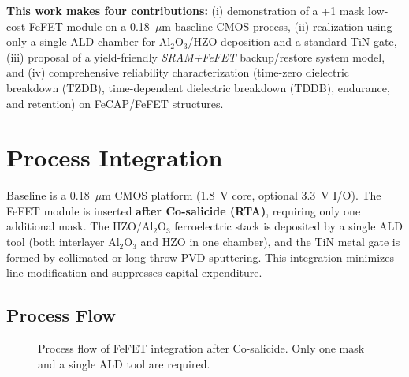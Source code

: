 \documentclass[conference]{IEEEtran}
\begin{document}
\textbf{This work makes four contributions:}  
(i) demonstration of a +1 mask low-cost FeFET module on a 0.18~$\mu$m baseline CMOS process,  
(ii) realization using only a single ALD chamber for Al$_2$O$_3$/HZO deposition and a standard TiN gate,  
(iii) proposal of a yield-friendly \textit{SRAM+FeFET} backup/restore system model, and  
(iv) comprehensive reliability characterization (time-zero dielectric breakdown (TZDB), time-dependent dielectric breakdown (TDDB), endurance, and retention) on FeCAP/FeFET structures.

\section{Process Integration}
Baseline is a 0.18~$\mu$m CMOS platform (1.8~V core, optional 3.3~V I/O).
The FeFET module is inserted \textbf{after Co-salicide (RTA)}, requiring only one additional mask.
The HZO/Al$_2$O$_3$ ferroelectric stack is deposited by a single ALD tool (both interlayer Al$_2$O$_3$ and HZO in one chamber), 
and the TiN metal gate is formed by collimated or long-throw PVD sputtering.
This integration minimizes line modification and suppresses capital expenditure.

\subsection{Process Flow}
\begin{figure}[!t]
  \centering
  \caption{Process flow of FeFET integration after Co-salicide. Only one mask and a single ALD tool are required.}
  \label{fig:flow}
\end{figure}
\end{document}
